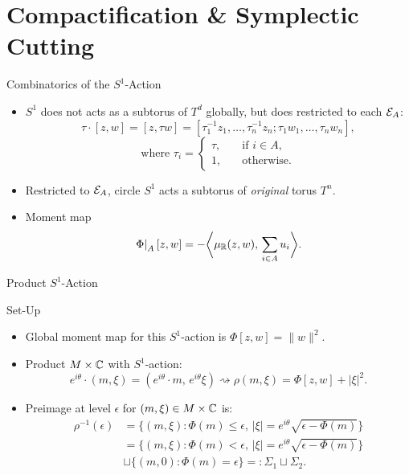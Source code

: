 \section{Compactification \& Symplectic Cutting}

\begin{frame}{Combinatorics of the $S^{1}$-Action}
    \begin{itemize}
        \item $S^{1}$ does not acts as a subtorus of $T^{d}$ globally, but does restricted to each $\mathcal{E}_{A}$:
        \begin{equation*}
            \tau \cdot [z,w] = [z,\tau w] = [\tau^{-1}_{1}z_{1}, \ldots, \tau^{-1}_{n}z_{n}; \tau_{1}w_{1}, \ldots, \tau_{n}w_{n}],
        \end{equation*}
        \begin{equation*}
            \text{where } \tau_{i} = 
            \begin{cases}
                \tau, \quad &\text{if } i \in A, \\
                1, \quad &\text{otherwise}.
            \end{cases}
        \end{equation*}
        \item Restricted to $\mathcal{E}_{A}$, circle $S^{1}$ acts a subtorus of \emph{original} torus $T^{n}$.
        \item Moment map
        $$ \left.\Phi\right|_{A}[z,w] = - \bigg\langle \mu_{\mathbb{R}}(z,w),\, \sum_{i\in A} u_{i} \bigg\rangle. $$
    \end{itemize}
\end{frame}

\begin{frame}{Product $S^{1}$-Action}
    \begin{block}{Set-Up}
        \begin{itemize}
            \item Global moment map for this $S^{1}$-action is $\Phi[z,w] = \|w\|^{2}$.
            \item Product $M \times \mathbb{C}$ with $S^{1}$-action:
            $$ e^{i\theta}\cdot (m,\xi) = (e^{i\theta}\cdot m,\, e^{i\theta}\xi ) \rightsquigarrow \rho(m,\xi) = \Phi[z,w] + |\xi|^{2}. $$
            \item Preimage at level $\epsilon$ for $(m, \xi) \in M \times \mathbb{C}$ is:
            \begin{equation*}
                \begin{split}
                    \rho^{-1}(\epsilon) &= \big\{ (m,\xi) : \Phi(m) \leq \epsilon,\, |\xi| = e^{i\theta} \sqrt{\epsilon - \Phi(m)} \big\} \\
                    &= \big\{ (m,\xi) : \Phi(m) < \epsilon,\, |\xi| = e^{i\theta}\sqrt{\epsilon - \Phi(m)} \big\} \\
                    &\sqcup \big\{ (m,0) : \Phi(m) = \epsilon \big\} =: \Sigma_{1} \sqcup \Sigma_{2}.
                \end{split}
            \end{equation*}
        \end{itemize}
    \end{block}
\end{frame}

